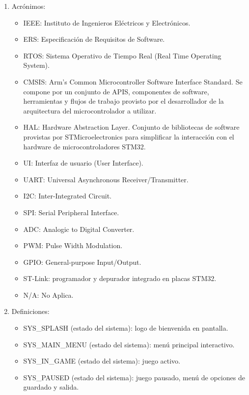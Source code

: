 \documentclass[11pt,a4paper]{article}
\begin{document}
\begin{enumerate}
  \item Acrónimos:
  \begin{itemize}
    \item IEEE: Instituto de Ingenieros Eléctricos y Electrónicos.
    \item ERS: Especificación de Requisitos de Software.
    \item RTOS: Sistema Operativo de Tiempo Real (Real Time Operating System).
    \item CMSIS: Arm's Common Microcontroller Software Interface Standard. Se compone por un conjunto de APIS, componentes de software, herramientas y flujos de trabajo provisto por el desarrollador de la arquitectura del microcontrolador a utilizar.
    \item HAL: Hardware Abstraction Layer. Conjunto de bibliotecas de software provistas por STMicroelectronics para simplificar la interacción con el hardware de microcontroladores STM32.
    \item UI: Interfaz de usuario (User Interface).
    \item UART: Universal Asynchronous Receiver/Transmitter. 
    \item I2C: Inter-Integrated Circuit.
    \item SPI: Serial Peripheral Interface.
    \item ADC: Analogic to Digital Converter.
    \item PWM: Pulse Width Modulation.
    \item GPIO: General-purpose Input/Output.
    \item ST-Link: programador y depurador integrado en placas STM32.
    \item N/A: No Aplica.
  \end{itemize}
  \item Definiciones:
  \begin{itemize}
    \item SYS\_SPLASH (estado del sistema): logo de bienvenida en pantalla.
    \item SYS\_MAIN\_MENU (estado del sistema): menú principal interactivo.
    \item SYS\_IN\_GAME (estado del sistema): juego activo.
    \item SYS\_PAUSED (estado del sistema): juego pausado, menú de opciones de guardado y salida.
  \end{itemize}
\end{enumerate}
\end{document}
